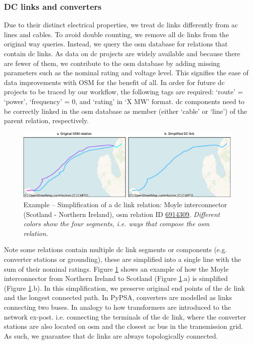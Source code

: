 \documentclass[fleqn,10pt]{wlscirep}
\let\autocite\cite
\begin{document}
\subsubsection*{DC links and converters}
Due to their distinct electrical properties, we treat \acrshort{dc} links differently from \acrshort{ac} lines and cables. To avoid double counting, we remove all \acrshort{dc} links from the original way queries. Instead, we query the \gls{osm} database for relations that contain \acrshort{dc} links. As data on \acrshort{dc} projects are widely available and because there are fewer of them,\autocite{entso-eENTSOETransmissionSystem,pierriChallengesOpportunitiesEuropean2017} we contribute to the \gls{osm} database by adding missing parameters such as the nominal rating and voltage level. This signifies the ease of data improvements with OSM for the benefit of all. In order for future \acrshort{dc} projects to be traced by our workflow, the following tags are required: `route' = `power', `frequency' = 0, and `rating' in `X MW' format. \acrshort{dc} components need to be correctly linked in the \acrshort{osm} database as member (either `cable' or `line') of the parent relation, respectively.

\begin{figure}[!htbp]
    \centering
    \includegraphics{figures/fig_dc_example.pdf}
    \caption{Example -- Simplification of a \acrshort{dc} link relation: Moyle interconnector (Scotland - Northern Ireland), \acrshort{osm} relation ID \href{https://www.openstreetmap.org/relation/6914309}{6914309}. \textit{Different colors show the four segments, i.e. ways that compose the \acrshort{osm} relation.}}
    \label{fig:dc_example}
\end{figure}

Note some relations contain multiple \acrshort{dc} link segments or components (e.g. converter stations or grounding), these are simplified into a single line with the sum of their nominal ratings. Figure \ref{fig:dc_example} shows an example of how the Moyle interconnector from Northern Ireland to Scotland (Figure \ref{fig:dc_example}.a) is simplified (Figure \ref{fig:dc_example}.b). In this simplification, we preserve original end points of the \acrshort{dc} link and the longest connected path. In PyPSA, converters are modelled as links connecting two buses. In analogy to how transformers are introduced to the network ex-post. i.e. connecting the terminals of the \acrshort{dc} link, where the converter stations are also located on \acrshort{osm} and the closest \acrshort{ac} bus in the transmission grid. As such, we guarantee that \acrshort{dc} links are always topologically connected.
\end{document}

